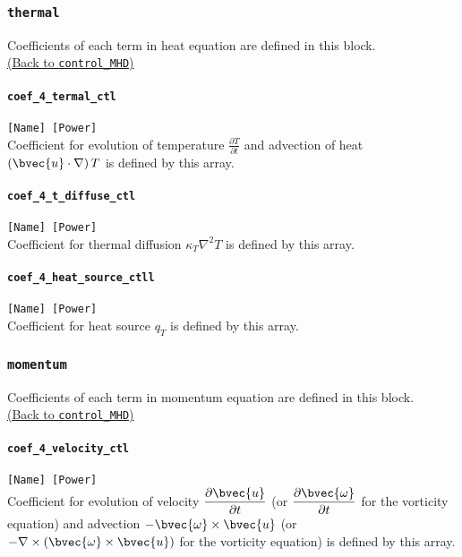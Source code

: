\subsubsection{\tt thermal}
\label{href_t:thermal}
Coefficients of each term in heat equation are defined in this block. \\
\hyperref[href_i:thermal]{(Back to {\tt control\_MHD})}

\paragraph{\tt coef\_4\_termal\_ctl}
\label{href_t:coef_4_termal_ctl}
\verb|[Name] [Power]| \\
Coefficient for evolution of temperature $\displaystyle \frac{\partial T}{\partial t}$ and advection of heat $\left(\bvec{u} \cdot \nabla \right) T$ is defined by this array.

\paragraph{\tt coef\_4\_t\_diffuse\_ctl}
\label{href_t:coef_4_t_diffuse_ctl}
\verb|[Name] [Power]| \\
Coefficient for thermal diffusion $\displaystyle \kappa_{T} \nabla^{2} T$ is defined by this array.

\paragraph{\tt coef\_4\_heat\_source\_ctll}
\label{href_t:coef_4_heat_source_ctl}
\verb|[Name] [Power]| \\
Coefficient for heat source $\displaystyle q_{T}$ is defined by this array.

\subsubsection{\tt momentum}
\label{href_t:momentum}
Coefficients of each term in momentum equation are defined in this block. \\
\hyperref[href_i:momentum]{(Back to {\tt control\_MHD})}

\paragraph{\tt coef\_4\_velocity\_ctl}
\label{href_t:coef_4_velocity_ctl}
\verb|[Name] [Power]| \\
Coefficient for evolution of velocity $\displaystyle \frac{\partial \bvec{u}}{\partial t}$ (or $\displaystyle \frac{\partial \bvec{\omega}}{\partial t}$ for the vorticity equation) and advection $-\bvec{\omega} \times \bvec{u}$ (or $- \nabla \times \left(\bvec{\omega} \times \bvec{u} \right)$ for the vorticity equation) is defined by this array.

